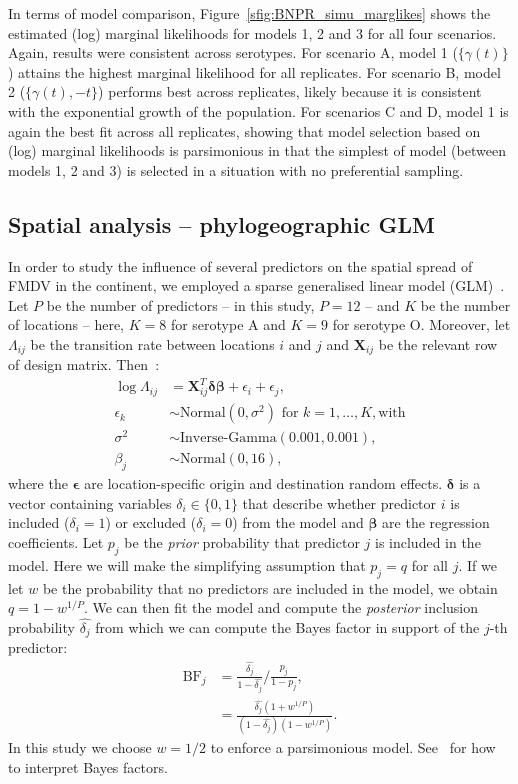 \documentclass[a4paper,10pt]{article}
\begin{document}
In terms of model comparison, Figure~\ref{sfig:BNPR_simu_marglikes} shows the estimated (log) marginal likelihoods for models 1, 2 and 3 for all four scenarios.
Again, results were consistent across serotypes. 
For scenario A, model 1 ($ \{ \gamma(t) \}$) attains the highest marginal likelihood for all replicates.
For scenario B, model 2 ($ \{ \gamma(t), -t\}$) performs best across replicates, likely because it is consistent with the exponential growth of the population.
For scenarios C and D, model 1 is again the best fit across all replicates, showing that model selection based on (log) marginal likelihoods is parsimonious in that the simplest of model (between models 1, 2 and 3) is selected in a situation with no preferential sampling.

\subsection*{Spatial analysis -- phylogeographic GLM}

In order to study the influence of several predictors on the spatial spread of FMDV in the continent, we employed a sparse generalised linear model (GLM)~\citep{M-Lemey2014,M-Dudas2017}.
Let $P$ be the number of predictors -- in this study, $P = 12$ -- and $K$ be the number of locations -- here, $K = 8$ for serotype A and $K = 9$ for serotype O.
Moreover, let $\Lambda_{ij}$ be the transition rate between locations $i$ and $j$ and $\boldsymbol X_{ij}$ be the relevant row of design matrix.
Then~\citep{M-Dudas2017}:
\begin{align*}
 \log \Lambda_{ij}  &= \boldsymbol X_{ij}^T \boldsymbol\delta \boldsymbol{\beta}
+ \epsilon_i + \epsilon_j, \\
\epsilon_k &\sim \text{Normal}(0, \sigma^2) \text{ for } k = 1, \ldots, K, \text{with} \\
\sigma^2 &\sim \text{Inverse-Gamma}(0.001, 0.001),\\
\beta_j &\sim \text{Normal}(0, 16),
\end{align*}
where the $\boldsymbol\epsilon$ are location-specific origin and destination random effects.
$\boldsymbol\delta$ is a vector containing variables $\delta_i \in \{0, 1\}$ that describe whether predictor $i$ is included ($\delta_i = 1$) or excluded ($\delta_i = 0$) from the model and $\boldsymbol\beta$ are the regression coefficients.
Let $p_j$ be the \textit{prior} probability that predictor $j$ is included in the model.
Here we will make the simplifying assumption that $p_j = q$ for all $j$.
If we let $w$ be the probability that no predictors are included in the model, we obtain  $q = 1 - w^{1/P}$.
We can then fit the model and compute the \textit{posterior} inclusion probability $\hat{\delta_j}$ from which we can compute the Bayes factor in support of the $j$-th predictor:
\begin{align*}
 \text{BF}_j &= \frac{\hat{\delta_j} }{1-\hat{\delta_j} }/\frac{p_j}{1-p_j}, \\
  &= \frac{\hat{\delta_j} (1 + w^{1/P})}{(1-\hat{\delta_j})(1 - w^{1/P}) }.
\end{align*}
In this study we choose $w = 1/2$ to enforce a parsimonious model.
See~\citet{M-KassRaftery1995} for how to interpret Bayes factors.
\end{document}
